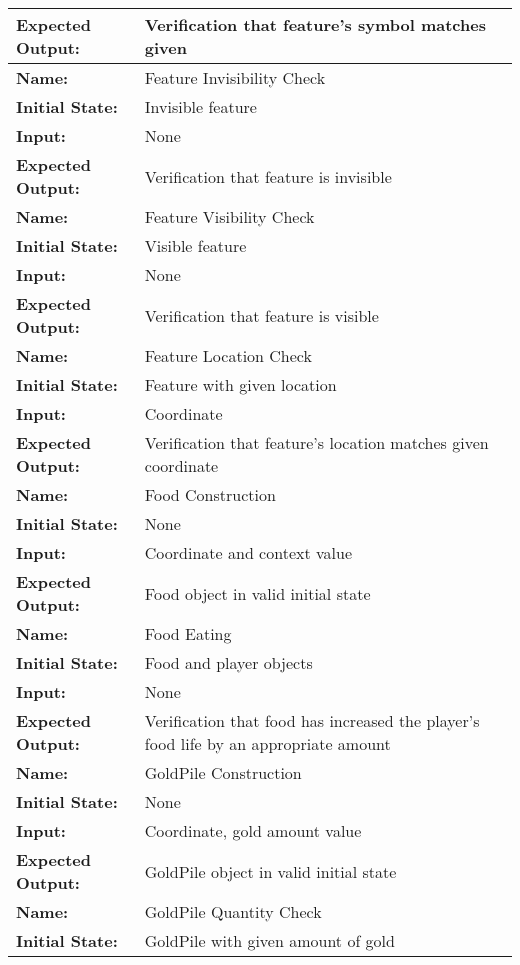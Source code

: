 \documentclass[12pt, titlepage]{article}
\begin{document}
\begin{center}
\begin{longtable}{ l | p{10cm} }
				\textbf{Expected Output:} & Verification that feature's symbol matches given\\
				\hline
				\textbf{Name:} & Feature Invisibility Check\\
				\textbf{Initial State:} & Invisible feature\\
				\textbf{Input:} & None\\
				\textbf{Expected Output:} & Verification that feature is invisible\\
				\hline
				\textbf{Name:} & Feature Visibility Check\\
				\textbf{Initial State:} & Visible feature\\
				\textbf{Input:} & None\\
				\textbf{Expected Output:} & Verification that feature is visible\\
				\hline
				\textbf{Name:} & Feature Location Check\\
				\textbf{Initial State:} & Feature with given location\\
				\textbf{Input:} & Coordinate\\
				\textbf{Expected Output:} & Verification that feature's location matches given coordinate\\
				\hline
				\textbf{Name:} & Food Construction\\
				\textbf{Initial State:} & None\\
				\textbf{Input:} & Coordinate and context value\\
				\textbf{Expected Output:} & Food object in valid initial state\\
				\hline
				\textbf{Name:} & Food Eating\\
				\textbf{Initial State:} & Food and player objects\\
				\textbf{Input:} & None\\
				\textbf{Expected Output:} & Verification that food has increased the player's food life by an appropriate amount\\
				\hline
				\textbf{Name:} & GoldPile Construction\\
				\textbf{Initial State:} & None\\
				\textbf{Input:} & Coordinate, gold amount value\\
				\textbf{Expected Output:} & GoldPile object in valid initial state\\
				\hline
				\textbf{Name:} & GoldPile Quantity Check\\
				\textbf{Initial State:} & GoldPile with given amount of gold\\

\end{longtable}
\end{center}
\end{document}
